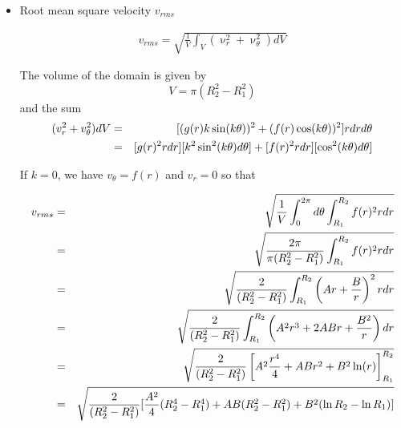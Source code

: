 \begin{itemize}
\item Root mean square velocity $v_{rms}$

\begin{eqnarray}
v_{rms}=\sqrt{\frac{1}{V}\int_V (\upnu_r^2+\upnu_\theta^2)dV   }
\end{eqnarray}

The volume of the domain is given by 
\[
V=\pi(R_2^2-R_1^2)
\]
and the sum
\begin{eqnarray}
(v_r^2+v_\theta^2 )dV 
&=& [(g(r) k  \sin(k\theta))^2+    (f(r) \cos (k\theta))^2] rdrd\theta \nonumber\\
&=& [g(r)^2r dr] [k^2  \sin^2(k\theta) d\theta ]+    [f(r)^2 r dr] [ \cos^2 (k\theta) d\theta] \nonumber
\end{eqnarray}

If $k=0$, we have  $v_\theta = f(r)$ and $v_r = 0$ so that 

\begin{eqnarray}
v_{rms}
&=& \sqrt{ \frac{1}{V}  \int_0^{2\pi}  d\theta  \int_{R_1}^{R_2} f(r)^2 r dr  } \nonumber\\
&=& \sqrt{ \frac{2 \pi}{\pi(R_2^2-R_1^2) }     \int_{R_1}^{R_2} f(r)^2 r dr  } \nonumber\\
&=& \sqrt{ \frac{2 }{(R_2^2-R_1^2) }    \int_{R_1}^{R_2} \left( Ar + \frac{B}{r} \right)^2 r dr } \nonumber\\
&=& \sqrt{ \frac{2 }{(R_2^2-R_1^2) }   \int_{R_1}^{R_2} \left( A^2r^3 + 2ABr + \frac{B^2}{r}  \right) dr } \nonumber\\
&=& \sqrt{ \frac{2 }{(R_2^2-R_1^2) }    \left[ A^2 \frac{r^4}{4} + ABr^2 + B^2 \ln(r)  \right]_{R_1}^{R_2} } \nonumber\\
&=& \sqrt{ \frac{2 }{(R_2^2-R_1^2) }  [ \frac{A^2}{4}(R_2^4-R_1^4) + AB (R_2^2-R_1^2) + B^2 (\ln R_2 - \ln R_1) ] }
\end{eqnarray}


\end{itemize}
